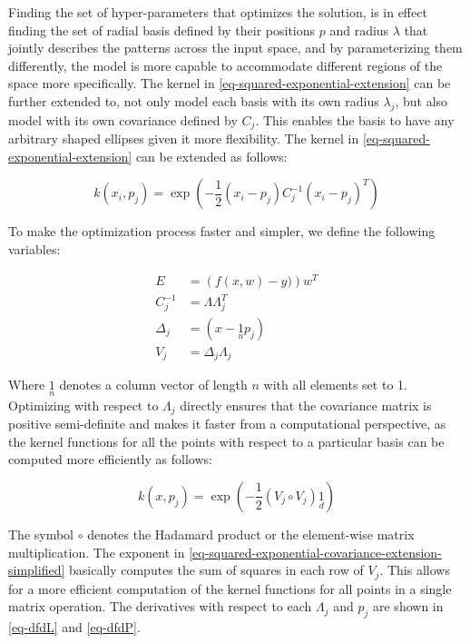 \documentclass[useAMS,usenatbib,fleqn]{mn2e}
\begin{document}
Finding the set of hyper-parameters that optimizes the solution, is in effect finding the set of radial basis defined by their positions $p$ and radius $\lambda$ that jointly describes the patterns across the input space, and by parameterizing them differently, the model is more capable to accommodate different regions of the space more specifically. The kernel in \eqref{eq-squared-exponential-extension} can be further extended to, not only model each basis with its own radius $\lambda_{j}$, but also model with its own covariance defined by $C_{j}$. This enables the basis to have any arbitrary shaped ellipses given it more flexibility. The kernel in \eqref{eq-squared-exponential-extension} can be extended as follows:

\begin{equation}
\label{eq-squared-exponential-covariance-extension}
k(x_{i},p_{j}) = \exp{\left(-\frac{1}{2}\left(x_{i}-p_{j}\right)C_{j}^{-1}\left(x_{i}-p_{j}\right)^{T}\right)}
\end{equation}

To make the optimization process faster and simpler, we define the following variables:

\begin{subequations}
\begin{align} 
\label{eq-error}
E &= \left(f(x,w)-y)\right)w^{T}\\
\label{eq-Cinv}
C_{j}^{-1} &= \Lambda\Lambda_{j}^{T}\\
\label{eq-Delta_j}
\Delta_{j} &= \left(x-\underset{n}{1}p_{j}\right)\\
\label{eq-V_j}
V_{j} &= \Delta_{j}\Lambda_{j}
\end{align}
\end{subequations}

Where $\underset{n}{1}$ denotes a column vector of length $n$ with all elements set to 1. Optimizing with respect to $\Lambda_{j}$ directly ensures that the covariance matrix is positive semi-definite and makes it faster from a computational perspective, as the kernel functions for all the points with respect to a particular basis can be computed more efficiently as follows:

\begin{equation}
\label{eq-squared-exponential-covariance-extension-simplified}
k(x,p_{j}) = \exp{\left(-\frac{1}{2}\left(V_{j}\circ V_{j}\right)\underset{d}{1}\right)}
\end{equation}

The symbol $\circ$ denotes the Hadamard product or the element-wise matrix multiplication. The exponent in \eqref{eq-squared-exponential-covariance-extension-simplified} basically computes the sum of squares in each row of $V_{j}$. This allows for a more efficient computation of the kernel functions for all points in a single matrix operation. The derivatives with respect to each $\Lambda_{j}$ and $p_{j}$ are shown in \eqref{eq-dfdL} and \eqref{eq-dfdP}.
\end{document}
